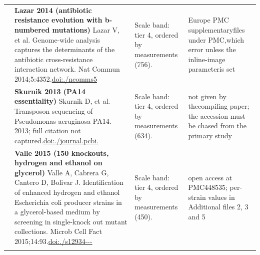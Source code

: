 \begin{landscape}
\begin{longtable}{@{}r@{\hspace{4pt}} L{78mm} L{72mm} L{76mm}@{}}
 & \textbf{Lazar 2014 (antibiotic resistance evolution with b-numbered mutations)} \newline Lazar V, et al. Genome-wide analysis captures the determinants of the antibiotic cross-resistance interaction network. Nat Commun 2014;5:4352.\newline \href{https://doi.org/10.1038/ncomms5352}{doi:./\allowbreak ncomms5} & Scale band: tier 4, ordered by measurements (756). & Europe P\allowbreak MC suppl\allowbreak ementary\allowbreak  files u\allowbreak nder PMC,\allowbreak  which e\allowbreak rror unl\allowbreak ess the \allowbreak inline-\allowbreak image p\allowbreak arameter\allowbreak  is set \\
 & \textbf{Skurnik 2013 (PA14 essentiality)} \newline Skurnik D, et al. Transposon sequencing of Pseudomonas aeruginosa PA14. 2013; full citation not captured.\newline \href{https://doi.org/10.1371/journal.pcbi.1013945}{doi:./\allowbreak journal\allowbreak .\allowbreak pcbi.} & Scale band: tier 4, ordered by measurements (634). & not give\allowbreak n by the\allowbreak  compili\allowbreak ng paper\allowbreak ; the ac\allowbreak cession \allowbreak must be \allowbreak chased f\allowbreak rom the \allowbreak primary \allowbreak study \\
 & \textbf{Valle 2015 (150 knockouts, hydrogen and ethanol on glycerol)} \newline Valle A, Cabrera G, Cantero D, Bolivar J. Identification of enhanced hydrogen and ethanol Escherichia coli producer strains in a glycerol-based medium by screening in single-knock out mutant collections. Microb Cell Fact 2015;14:93.\newline \href{https://doi.org/10.1186/s12934-015-0285-6}{doi:./\allowbreak s12934---} & Scale band: tier 4, ordered by measurements (450). & open acc\allowbreak ess at P\allowbreak MC448535; per-\allowbreak strain \allowbreak values i\allowbreak n Additi\allowbreak onal fil\allowbreak es 2, 3 \allowbreak and 5 \\
\addlinespace[5pt]

\end{longtable}
\end{landscape}
